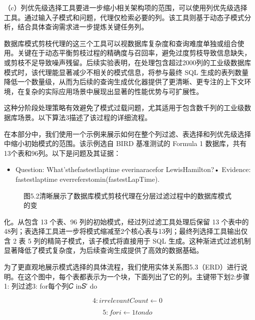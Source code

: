 \documentclass[12pt,a4paper,openright,UTF8]{ctexbook}
\begin{document}
（c）列优先级选择工具要进一步缩小相关架构项的范围，可以使用列优先级选择工具。通过输入子模式和问题，代理仅检索必要的列。该工具则基于动态子模式分析，结合具体查询需求进一步提炼关键任务列。


数据库模式剪枝代理的这三个工具可以视数据库复杂度和查询难度单独或组合使用。关键在于动态平衡剪枝过程的精确度与召回率，避免过度剪枝导致信息缺失，或剪枝不足导致噪声残留。后续实验表明，在处理包含超过2000列的工业级数据库模式时，该代理能显著减少不相关的模式信息，将参与最终 SQL 生成的表列数量降低一个数量级，从而为后续的查询生成优化器提供了更清晰、更专注的上下文环境，在复杂的实际应用场景中展现出显著的性能优势与可扩展性。


这种分阶段处理策略有效避免了模式过载问题，尤其适用于包含数千列的工业级数据库场景。以下算法3描述了该过程的详细流程。


在本部分中，我们使用一个示例来展示如何在整个列过滤、表选择和列优先级选择中缩小初始模式的范围。该示例选自 BIRD 基准测试的 Formula 1 数据库，共有13个表和96列。以下是问题及其证据：

\begin{itemize}
\item Question: What’sthefastestlaptime everinaracefor LewisHamilton?• Evidence: fastestlaptime everreferstomin(fastestLapTime).
\end{itemize}

\begin{figure}[htbp]
\centering
{}
\caption{图5.2清晰展示了数据库模式剪枝代理在分层过滤过程中的数据库模式的变}
\end{figure}

化。从包含 13 个表、96 列的初始模式，经过列过滤工具处理后保留 13 个表中的48列；表选择工具进一步将模式缩减至2个核心表与13列；最终列选择工具输出仅含 2 表 5 列的精简子模式，该子模式将直接用于 SQL 生成。这种渐进式过滤机制显著降低了模式复杂度，为后续查询生成提供了高效的数据基础。


为了更直观地展示模式选择的具体流程，我们使用实体关系图5.3（ERD）进行说明。在这个图中，每个表都表示为一个块，下面列出了它的列。主键带下划2:步骤1: 列过滤3: for每个列𝐶 in𝑆′ do

\begin{equation}
4: irrelevantCount \leftarrow 0
\end{equation}


\begin{equation}
5: fori \leftarrow 1 tondo
\end{equation}
\end{document}
